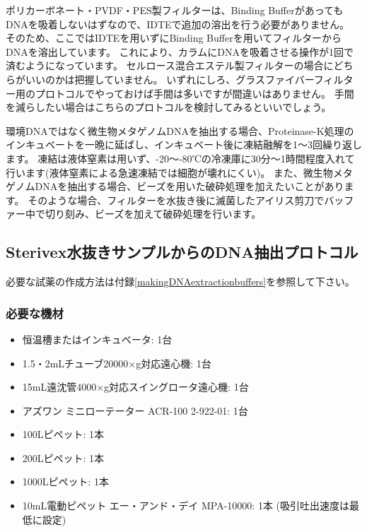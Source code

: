 \documentclass[titlepage,10pt,a4paper,uplatex]{jsbook}
\begin{document}
ポリカーボネート・PVDF・PES製フィルターは、Binding BufferがあってもDNAを吸着しないはずなので、IDTEで追加の溶出を行う必要がありません。
そのため、ここではIDTEを用いずにBinding Bufferを用いてフィルターからDNAを溶出しています。
これにより、カラムにDNAを吸着させる操作が1回で済むようになっています。
セルロース混合エステル製フィルターの場合にどちらがいいのかは把握していません。
いずれにしろ、グラスファイバーフィルター用のプロトコルでやっておけば手間は多いですが間違いはありません。
手間を減らしたい場合はこちらのプロトコルを検討してみるといいでしょう。

環境DNAではなく微生物メタゲノムDNAを抽出する場合、Proteinase-K処理のインキュベートを一晩に延ばし、インキュベート後に凍結融解を1～3回繰り返します。
凍結は液体窒素は用いず、{-20}～{-80}℃の冷凍庫に30分～1時間程度入れて行います(液体窒素による急速凍結では細胞が壊れにくい)。
また、微生物メタゲノムDNAを抽出する場合、ビーズを用いた破砕処理を加えたいことがあります。
そのような場合、フィルターを水抜き後に滅菌したアイリス剪刀でバッファー中で切り刻み、ビーズを加えて破砕処理を行います。

\subsection{Sterivex水抜きサンプルからのDNA抽出プロトコル}

必要な試薬の作成方法は付録\ref{makingDNAextractionbuffers}を参照して下さい。

\subsubsection{必要な機材}
\begin{itemize}
\item 恒温槽またはインキュベータ: 1台
\item 1.5・2mLチューブ20000×g対応遠心機: 1台
\item 15mL遠沈管4000×g対応スイングロータ遠心機: 1台
\item アズワン ミニローテーター ACR-100 2-922-01: 1台
\item 100{\textmu}Lピペット: 1本
\item 200{\textmu}Lピペット: 1本
\item 1000{\textmu}Lピペット: 1本
\item 10mL電動ピペット エー・アンド・デイ MPA-10000: 1本 (吸引吐出速度は最低に設定)
\end{itemize}
\end{document}
